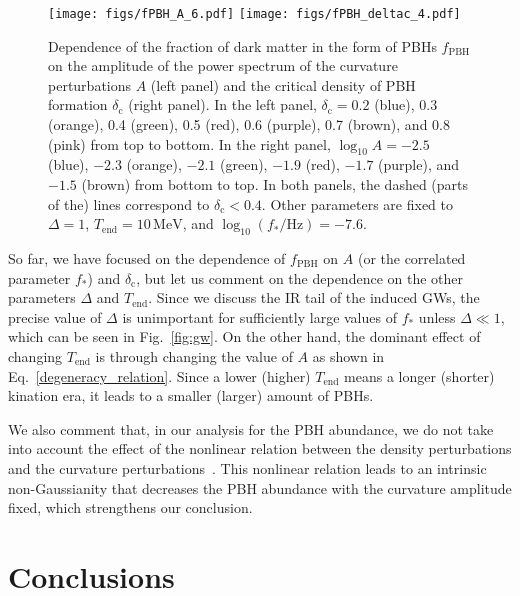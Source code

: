 \documentclass[superscriptaddress, aps, preprintnumbers,
amsmath, amssymb, sort&compress, nofootinbib, 10pt, paper, floatfix]{revtex4-2}
\begin{document}
\begin{figure}
        \centering \texttt{[image: figs/fPBH\_A\_6.pdf]}
        \texttt{[image: figs/fPBH\_deltac\_4.pdf]}
        \caption{ 
        Dependence of the fraction of dark matter in the form of PBHs $f_\text{PBH}$ on the amplitude of the power spectrum of the curvature perturbations $A$ (left panel) and the critical density of PBH formation $\delta_\text{c}$ (right panel). 
        In the left panel, $\delta_\text{c} = 0.2$ (blue), 0.3 (orange), 0.4 (green), 0.5 (red), 0.6 (purple), 0.7 (brown), and 0.8 (pink) from top to bottom.  In the right panel, $\log_{10} A = -2.5$ (blue), $-2.3$ (orange), $-2.1$ (green), $-1.9$ (red), $-1.7$ (purple), and $-1.5$ (brown) from bottom to top.         
        In both panels, the dashed (parts of the) lines correspond to $\delta_\text{c} < 0.4$. Other parameters are fixed to $\Delta = 1$, $T_\text{end} = 10\, \mathrm{MeV}$, and $\log_{10}(f_*/\text{Hz}) = -7.6$.
        }
        \label{fig:f_PBH}
\end{figure}

So far, we have focused on the dependence of $f_\text{PBH}$ on $A$ (or the correlated parameter $f_*$) and $\delta_\text{c}$, but let us comment on the dependence on the other parameters $\Delta$ and $T_\text{end}$.  Since we discuss the IR tail of the induced GWs, the precise value of $\Delta$ is unimportant for sufficiently large values of $f_*$ unless $\Delta \ll 1$, which can be seen in Fig.~\ref{fig:gw}. 
On the other hand, the dominant effect of changing $T_\text{end}$ is through changing the value of $A$ as shown in Eq.~\eqref{degeneracy_relation}. Since a lower (higher) $T_\text{end}$ means a longer (shorter) kination era, it leads to a smaller (larger) amount of PBHs. 

We also comment that, in our analysis for the PBH abundance, we do not take into account the effect of the nonlinear relation between the density perturbations and the curvature perturbations~\cite{Kawasaki:2019mbl,Young:2019yug,DeLuca:2019qsy}. 
This nonlinear relation leads to an intrinsic non-Gaussianity that decreases the PBH abundance with the curvature amplitude fixed, which strengthens our conclusion.


\section{Conclusions} \label{sec:conclusion}
\end{document}
